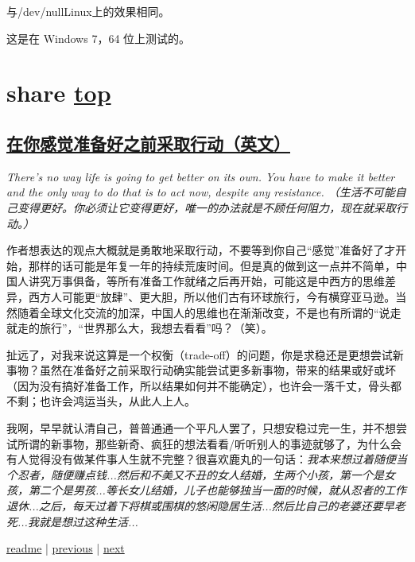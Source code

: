 \begin{myquote}
与/dev/nullLinux上的效果相同。
\end{myquote}

\begin{myquote}
这是在 Windows 7，64 位上测试的。
\end{myquote}

\section{share \hyperref[chap:w5]{top}}\label{w5:share}

\subsection{\href{https://medium.com/the-ascent/why-you-should-take-action-before-you-feel-ready-not-after-16e41e5b840f}{在你感觉准备好之前采取行动（英文）}}

\textit{There's no way life is going to get better on its own. You have to make it better and the only way to do that is to act now, despite any resistance. （生活不可能自己变得更好。你必须让它变得更好，唯一的办法就是不顾任何阻力，现在就采取行动。）}

作者想表达的观点大概就是勇敢地采取行动，不要等到你自己“感觉”准备好了才开始，那样的话可能是年复一年的持续荒废时间。但是真的做到这一点并不简单，中国人讲究万事俱备，等所有准备工作就绪之后再开始，可能这是中西方的思维差异，西方人可能更“放肆”、更大胆，所以他们古有环球旅行，今有横穿亚马逊。当然随着全球文化交流的加深，中国人的思维也在渐渐改变，不是也有所谓的“说走就走的旅行”，“世界那么大，我想去看看”吗？（笑）。

扯远了，对我来说这算是一个权衡（trade-off）的问题，你是求稳还是更想尝试新事物？虽然在准备好之前采取行动确实能尝试更多新事物，带来的结果或好或坏（因为没有搞好准备工作，所以结果如何并不能确定），也许会一落千丈，骨头都不剩；也许会鸿运当头，从此人上人。

我啊，早早就认清自己，普普通通一个平凡人罢了，只想安稳过完一生，并不想尝试所谓的新事物，那些新奇、疯狂的想法看看/听听别人的事迹就够了，为什么会有人觉得没有做某件事人生就不完整？很喜欢鹿丸的一句话：\textit{我本来想过着随便当个忍者，随便赚点钱...然后和不美又不丑的女人结婚，生两个小孩，第一个是女孩，第二个是男孩...等长女儿结婚，儿子也能够独当一面的时候，就从忍者的工作退休...之后，每天过着下将棋或围棋的悠闲隐居生活...然后比自己的老婆还要早老死...我就是想过这种生活...}

\noindent \href{https://github.com/taseikyo/arts}{readme} | \hyperref[chap:w4]{previous} | \hyperref[chap:w6]{next}
